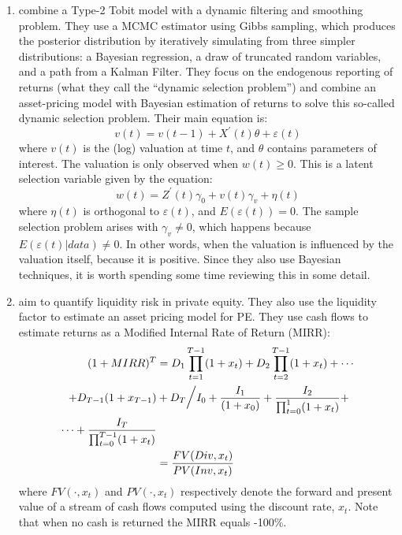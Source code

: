 \documentclass[final,5p,times,twocolumn,authoryear]{elsarticle}
\begin{document}
\begin{enumerate}[resume, label=(\roman*)]
	\item \cite{Korteweg2011} 	combine a Type-2 Tobit model with a dynamic filtering and smoothing problem. They use a MCMC estimator using Gibbs sampling, which produces the posterior distribution by iteratively simulating from three simpler distributions: a Bayesian regression, a draw of truncated random variables, and a path from a Kalman Filter. They focus on the endogenous reporting of returns (what they call the ``dynamic selection problem'') and combine an asset-pricing model with Bayesian estimation of returns to solve this so-called dynamic selection problem. Their main equation is:
	\begin{equation}
		v(t) = v(t-1) + X^\prime (t) \theta + \varepsilon(t)
	\end{equation}
	where $v(t)$ is the (log) valuation at time $t$, and $\theta$ contains parameters of interest. The valuation is only observed when $w(t) \geq 0$. This is a latent selection variable given by the equation:
	\begin{equation}
		w(t) = Z^\prime(t) \gamma_0 + v(t) \gamma_v + \eta(t)
	\end{equation}
	where $\eta(t)$ is orthogonal to $\varepsilon(t)$, and $E(\varepsilon(t)) = 0$. The sample selection problem arises with $\gamma_v \neq 0$, which happens because $E(\varepsilon(t) | data) \neq 0$. In other words, when the valuation is influenced by the valuation itself, because it is positive. Since they also use Bayesian techniques, it is worth spending some time reviewing this in some detail.
	
	\item \cite{Franzoni2011} aim to quantify liquidity risk in private equity. They also use the liquidity factor to estimate an asset pricing model for PE. They use cash flows to estimate returns as a Modified Internal Rate of Return (MIRR):
	\begin{align}
		(1 + MIRR)^T &= D_1 \prod_{t=1}^{T-1} ( 1 + x_t ) + D_2 \prod_{t=2}^{T-1} ( 1 + x_t ) + \cdots  \notag \\
			 + D_{T-1} ( 1 + x_{T-1} ) &+ D_T \bigg/ I_0 + \frac{I_1}{(1 + x_0)} +  \frac{I_2}{\prod_{t=0}^1 ( 1 + x_t )} + \notag \\
			  \cdots + \frac{I_T}{\prod_{t=0}^{T-1} ( 1 + x_t )}  \notag \\
			  &=	\frac{FV(Div, x_t)}{PV(Inv, x_t)}
	\end{align}
	where $FV(\cdot, x_t)$ and $PV(\cdot, x_t)$ respectively denote the forward and present value of a stream of cash flows computed using the discount rate, $x_t$. Note that when no cash is returned the MIRR equals -100\%. 
	

\end{enumerate}
\end{document}
